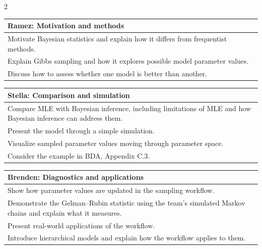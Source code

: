 \documentclass[10pt]{article}
\begin{document}
\begin{multicols*}{2}
\begingroup
\small
\setlength{\tabcolsep}{4pt}
\renewcommand{\arraystretch}{1.15}
\noindent\begin{tabularx}{\linewidth}{@{}>{\raggedright\arraybackslash}X@{}}
\hline
\textbf{Ramez: Motivation and methods} \\ \hline
Motivate Bayesian statistics and explain how it differs from frequentist methods. \\[3pt]
Explain Gibbs sampling and how it explores possible model parameter values. \\[3pt]
Discuss how to assess whether one model is better than another. \\ \hline
\end{tabularx}
\par
\endgroup

\medskip
\begingroup
\small
\setlength{\tabcolsep}{4pt}
\renewcommand{\arraystretch}{1.15}
\noindent\begin{tabularx}{\linewidth}{@{}>{\raggedright\arraybackslash}X@{}}
\hline
\textbf{Stella: Comparison and simulation} \\ \hline
Compare MLE with Bayesian inference, including limitations of MLE and how Bayesian inference can address them. \\[3pt]
Present the model through a simple simulation. \\[3pt]
Visualize sampled parameter values moving through parameter space. \\[3pt]
Consider the example in BDA, Appendix C.3. \\ \hline
\end{tabularx}
\par
\endgroup

\medskip
\begingroup
\small
\setlength{\tabcolsep}{4pt}
\renewcommand{\arraystretch}{1.15}
\noindent\begin{tabularx}{\linewidth}{@{}>{\raggedright\arraybackslash}X@{}}
\hline
\textbf{Brenden: Diagnostics and applications} \\ \hline
Show how parameter values are updated in the sampling workflow. \\[3pt]
Demonstrate the Gelman--Rubin statistic using the team's simulated Markov chains and explain what it measures. \\[3pt]
Present real-world applications of the workflow. \\[3pt]
Introduce hierarchical models and explain how the workflow applies to them. \\ \hline
\end{tabularx}
\par
\endgroup


\end{multicols*}
\end{document}
